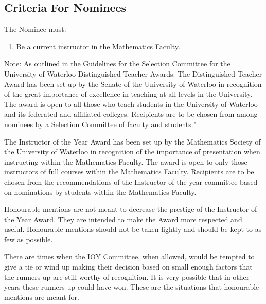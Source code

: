 \subsection{Criteria For Nominees}
The Nominee must:
\begin{enumerate}
\item Be a current instructor in the Mathematics Faculty.
\end{enumerate}

Note: As outlined in the Guidelines for the Selection Committee for the University of Waterloo Distinguished Teacher Awards: The Distinguished Teacher Award has been set up by the Senate of the University of Waterloo in recognition of the great importance of excellence in teaching at all levels in the University. The award is open to all those who teach students in the University of Waterloo and its federated and affiliated colleges. Recipients are to be chosen from among nominees by a Selection Committee of faculty and students."

The Instructor of the Year Award has been set up by the Mathematics Society of the University of Waterloo in recognition of the importance of presentation when instructing within the Mathematics Faculty. The award is open to only those instructors of full courses within the Mathematics Faculty. Recipients are to be chosen from the recommendations of the Instructor of the year committee based on nominations by students within the Mathematics Faculty.

Honourable mentions are not meant to decrease the prestige of the Instructor of the Year Award.  They are intended to make the Award more respected and useful.  Honourable mentions should not be taken lightly and should be kept to as few as possible.

There are times when the IOY Committee, when allowed, would be tempted to give a tie or wind up making their decision based on small enough factors that the runners up are still worthy of recognition.  It is very possible that in other years these runners up could have won.  These are the situations that honourable mentions are meant for.
